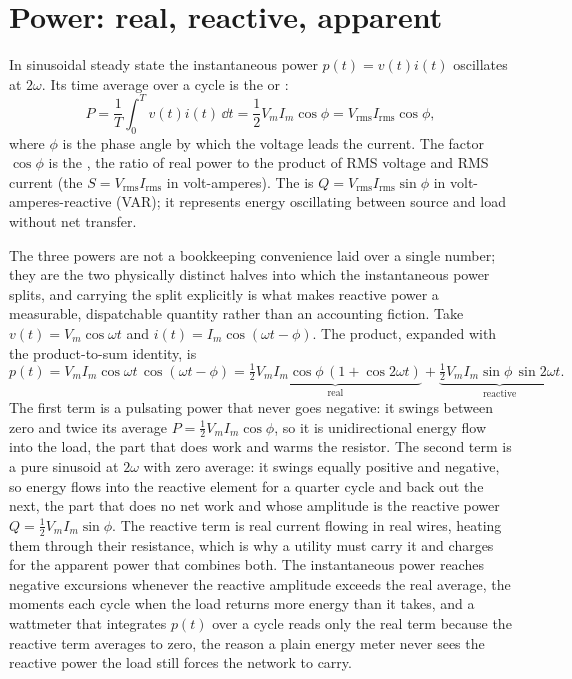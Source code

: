 \section{Power: real, reactive, apparent}

In sinusoidal steady state the instantaneous power $p(t) = v(t)i(t)$
oscillates at $2\omega$. Its time average over a cycle is the
 or :
\[
P = \frac{1}{T}\int_{0}^{T} v(t)i(t)\,\dd t = \frac{1}{2}V_{m}I_{m}
\cos\phi = V_{\text{rms}}I_{\text{rms}}\cos\phi,
\]
where $\phi$ is the phase angle by which the voltage leads the
current. The factor $\cos\phi$ is the , the
ratio of real power to the product of RMS voltage and RMS current
(the  $S = V_{\text{rms}}I_{\text{rms}}$ in
volt-amperes). The  is $Q = V_{\text{rms}}I_{
\text{rms}}\sin\phi$ in volt-amperes-reactive (VAR); it represents
energy oscillating between source and load without net transfer.

The three powers are not a bookkeeping convenience laid over a single number;
they are the two physically distinct halves into which the instantaneous power
splits, and carrying the split explicitly is what makes reactive power a
measurable, dispatchable quantity rather than an accounting fiction. Take
$v(t) = V_m\cos\omega t$ and $i(t) = I_m\cos(\omega t - \phi)$. The product,
expanded with the product-to-sum identity, is
\[
p(t) = V_m I_m\cos\omega t\,\cos(\omega t - \phi)
= \underbrace{\tfrac{1}{2}V_m I_m\cos\phi\,(1 + \cos 2\omega t)}_{\text{real}}
+ \underbrace{\tfrac{1}{2}V_m I_m\sin\phi\,\sin 2\omega t}_{\text{reactive}}.
\]
The first term is a pulsating power that never goes negative: it swings between
zero and twice its average $P = \tfrac{1}{2}V_m I_m\cos\phi$, so it is
unidirectional energy flow into the load, the part that does work and warms the
resistor. The second term is a pure sinusoid at $2\omega$ with zero average: it
swings equally positive and negative, so energy flows into the reactive element
for a quarter cycle and back out the next, the part that does no net work and
whose amplitude is the reactive power $Q = \tfrac{1}{2}V_m I_m\sin\phi$. The
reactive term is real current flowing in real wires, heating them through their
resistance, which is why a utility must carry it and charges for the apparent
power that combines both. The instantaneous power reaches negative excursions
whenever the reactive amplitude exceeds the real average, the moments each cycle
when the load returns more energy than it takes, and a wattmeter that integrates
$p(t)$ over a cycle reads only the real term because the reactive term averages
to zero, the reason a plain energy meter never sees the reactive power the load
still forces the network to carry.

